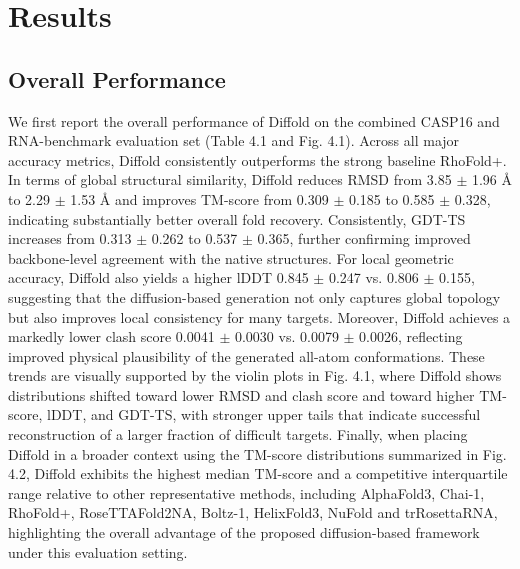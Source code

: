 \chapter{Results}

\section{Overall Performance}

We first report the overall performance of Diffold on the combined CASP16 and RNA-benchmark evaluation set (Table 4.1 and Fig. 4.1). Across all major accuracy metrics, Diffold consistently outperforms the strong baseline RhoFold+. In terms of global structural similarity, Diffold reduces RMSD from 3.85 $\pm$ 1.96 $\text{\AA}$ to 2.29 $\pm$ 1.53 $\text{\AA}$ and improves TM-score from 0.309 $\pm$ 0.185 to 0.585 $\pm$ 0.328, indicating substantially better overall fold recovery. Consistently, GDT-TS increases from 0.313 $\pm$ 0.262 to 0.537 $\pm$ 0.365, further confirming improved backbone-level agreement with the native structures. For local geometric accuracy, Diffold also yields a higher lDDT 0.845 $\pm$ 0.247 vs. 0.806 $\pm$ 0.155, suggesting that the diffusion-based generation not only captures global topology but also improves local consistency for many targets. Moreover, Diffold achieves a markedly lower clash score 0.0041 $\pm$ 0.0030 vs. 0.0079 $\pm$ 0.0026, reflecting improved physical plausibility of the generated all-atom conformations. These trends are visually supported by the violin plots in Fig. 4.1, where Diffold shows distributions shifted toward lower RMSD and clash score and toward higher TM-score, lDDT, and GDT-TS, with stronger upper tails that indicate successful reconstruction of a larger fraction of difficult targets. Finally, when placing Diffold in a broader context using the TM-score distributions summarized in Fig. 4.2, Diffold exhibits the highest median TM-score and a competitive interquartile range relative to other representative methods, including AlphaFold3\cite{Abramson2024AlphaFold3}, Chai-1\cite{Chai2024}, RhoFold+\cite{Shen2024RhoFoldPlus}, RoseTTAFold2NA\cite{baek2022rosettafoldna}, Boltz-1\cite{Wohlwend2024boltz}, HelixFold3\cite{liu2024helixfold3}, NuFold\cite{shen2022nufold} and trRosettaRNA\cite{Wang2023trRosettaRNA}, highlighting the overall advantage of the proposed diffusion-based framework under this evaluation setting.

